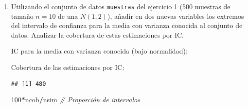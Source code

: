 \documentclass[]{book}
\newenvironment{Shaded}{\begin{snugshade}}{\end{snugshade}}
\newcommand{\KeywordTok}[1]{\textcolor[rgb]{0.13,0.29,0.53}{\textbf{#1}}}
\newcommand{\DecValTok}[1]{\textcolor[rgb]{0.00,0.00,0.81}{#1}}
\newcommand{\FloatTok}[1]{\textcolor[rgb]{0.00,0.00,0.81}{#1}}
\newcommand{\StringTok}[1]{\textcolor[rgb]{0.31,0.60,0.02}{#1}}
\newcommand{\CommentTok}[1]{\textcolor[rgb]{0.56,0.35,0.01}{\textit{#1}}}
\newcommand{\OperatorTok}[1]{\textcolor[rgb]{0.81,0.36,0.00}{\textbf{#1}}}
\newcommand{\NormalTok}[1]{#1}
\theoremstyle{definition}
\theoremstyle{definition}
\theoremstyle{definition}
\theoremstyle{remark}
\begin{document}
\begin{enumerate}
\def\labelenumi{\alph{enumi})}
\item
  Utilizando el conjunto de datos \texttt{muestras} del ejercicio 1 (500
  muestras de tamaño \(n=10\) de una \(N(1,2)\)), añadir en dos nuevas
  variables los extremos del intervalo de confianza para la media con
  varianza conocida al conjunto de datos. Analizar la cobertura de estas
  estimaciones por IC.

  IC para la media con varianza conocida (bajo normalidad):

\begin{Shaded}
\end{Shaded}

  Cobertura de las estimaciones por IC:

\begin{Shaded}
\end{Shaded}

\begin{verbatim}
## [1] 480
\end{verbatim}

\begin{Shaded}
\begin{Highlighting}[]
\DecValTok{100}\OperatorTok{*}\NormalTok{ncob}\OperatorTok{/}\NormalTok{nsim     }\CommentTok{# Proporción de intervalos}
\end{Highlighting}
\end{Shaded}


\end{enumerate}
\end{document}
